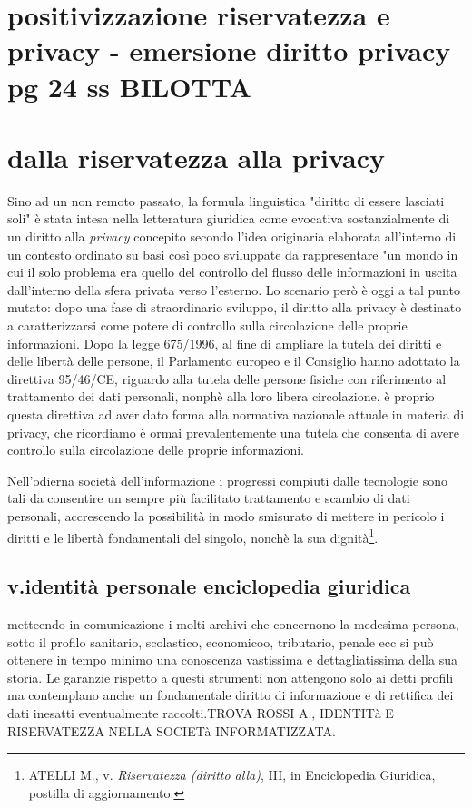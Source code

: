 \section{positivizzazione riservatezza e privacy - emersione diritto privacy pg 24 ss BILOTTA}

\section{dalla riservatezza alla privacy}
Sino ad un non remoto passato, la formula linguistica "diritto di essere lasciati soli" è stata intesa nella letteratura giuridica come evocativa sostanzialmente di un diritto alla \textit{privacy} concepito secondo l'idea originaria elaborata all'interno di un contesto ordinato su basi così poco sviluppate da rappresentare "un mondo in cui il solo problema era quello del controllo del flusso delle informazioni in uscita dall'interno della sfera privata verso l'esterno.
Lo scenario però è oggi a tal punto mutato: dopo una fase di straordinario sviluppo, il diritto alla privacy è destinato a caratterizzarsi come potere di controllo sulla circolazione delle proprie informazioni.
Dopo la legge 675/1996, al fine di ampliare la tutela dei diritti e delle libertà delle persone, il Parlamento europeo e il Consiglio hanno adottato la direttiva 95/46/CE, riguardo alla tutela delle persone fisiche con riferimento al trattamento dei dati personali, nonphè alla loro libera circolazione.
è proprio questa direttiva ad aver dato forma alla normativa nazionale attuale in materia di privacy, che ricordiamo è ormai prevalentemente  una tutela che consenta di avere controllo sulla circolazione delle proprie informazioni.

Nell'odierna società dell'informazione i progressi compiuti dalle tecnologie sono tali da consentire un sempre più facilitato trattamento e scambio di dati personali, accrescendo la possibilità in modo smisurato di mettere in pericolo i diritti e le libertà fondamentali del singolo, nonchè la sua dignità\footnote{ATELLI M., v. \textit{Riservatezza (diritto alla)}, III, in Enciclopedia Giuridica, postilla di aggiornamento.}.

\subsection{v.identità personale enciclopedia giuridica}
metteendo in comunicazione i molti archivi che concernono la medesima persona, sotto il profilo sanitario, scolastico, economicoo, tributario, penale ecc si può ottenere in tempo minimo una conoscenza vastissima e dettagliatissima della sua storia. Le garanzie rispetto a questi strumenti non attengono solo ai detti profili ma contemplano anche un fondamentale diritto di informazione e di rettifica dei dati inesatti eventualmente raccolti.TROVA ROSSI A., IDENTITà E RISERVATEZZA NELLA SOCIETà INFORMATIZZATA.


